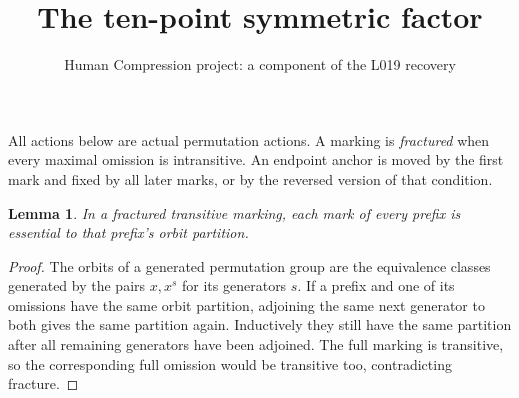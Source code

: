 \documentclass[11pt,a4paper]{article}
\title{The ten-point symmetric factor}
\author{Human Compression project: a component of the L019 recovery}
\date{}
\newtheorem{lemma}{Lemma}\newtheorem{theorem}[lemma]{Theorem}
\begin{document}
\maketitle
All actions below are actual permutation actions. A marking is
\emph{fractured} when every maximal omission is intransitive.
An endpoint anchor is moved by the first mark and fixed by all
later marks, or by the reversed version of that condition.

\begin{lemma}\label{orbits}
In a fractured transitive marking, each mark of every prefix is
essential to that prefix's orbit partition.
\end{lemma}
\begin{proof}
The orbits of a generated permutation group are the equivalence
classes generated by the pairs $x,x^s$ for its generators $s$.
If a prefix and one of its omissions have the same orbit partition,
adjoining the same next generator to both gives the same partition
again. Inductively they still have the same partition after all
remaining generators have been adjoined. The full marking is
transitive, so the corresponding full omission would be transitive
too, contradicting fracture.
\end{proof}
\end{document}
